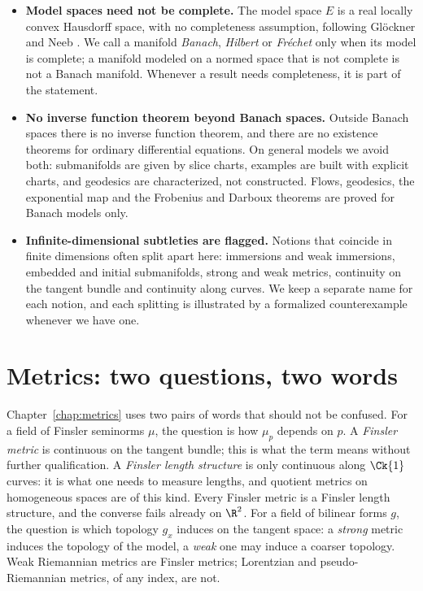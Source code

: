 \begin{itemize}
  \item \textbf{Model spaces need not be complete.} The model space $E$ is a real locally convex
  Hausdorff space, with no completeness assumption, following Glöckner and Neeb \cite{GN26}. We
  call a manifold \emph{Banach}, \emph{Hilbert} or \emph{Fréchet} only when its model is complete;
  a manifold modeled on a normed space that is not complete is not a Banach manifold. Whenever a
  result needs completeness, it is part of the statement.

  \item \textbf{No inverse function theorem beyond Banach spaces.} Outside Banach spaces there is
  no inverse function theorem, and there are no existence theorems for ordinary differential
  equations. On general models we avoid both: submanifolds are given by slice charts, examples are
  built with explicit charts, and geodesics are characterized, not constructed. Flows, geodesics,
  the exponential map and the Frobenius and Darboux theorems are proved for Banach models only.

  \item \textbf{Infinite-dimensional subtleties are flagged.} Notions that coincide in finite
  dimensions often split apart here: immersions and weak immersions, embedded and initial
  submanifolds, strong and weak metrics, continuity on the tangent bundle and continuity along
  curves. We keep a separate name for each notion, and each splitting is illustrated by a
  formalized counterexample whenever we have one.
\end{itemize}

\section*{Metrics: two questions, two words}

Chapter~\ref{chap:metrics} uses two pairs of words that should not be confused. For a field of
Finsler seminorms $\mu$, the question is how $\mu_p$ depends on $p$. A \emph{Finsler metric} is
continuous on the tangent bundle; this is what the term means without further qualification. A
\emph{Finsler length structure} is only continuous along $\Ck{1}$ curves: it is what one needs to
measure lengths, and quotient metrics on homogeneous spaces are of this kind. Every Finsler metric
is a Finsler length structure, and the converse fails already on $\R^2$. For a field of bilinear
forms $g$, the question is which topology $g_x$ induces on the tangent space: a \emph{strong}
metric induces the topology of the model, a \emph{weak} one may induce a coarser topology. Weak
Riemannian metrics are Finsler metrics; Lorentzian and pseudo-Riemannian metrics, of any index, are
not.

